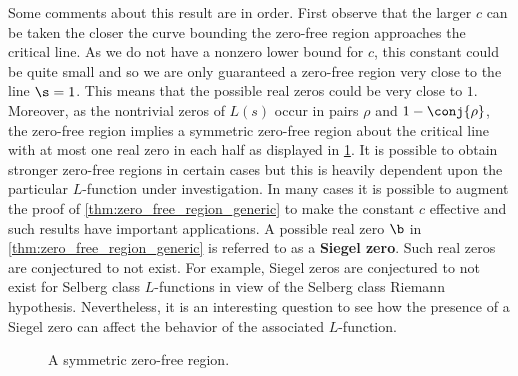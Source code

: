 \documentclass[12pt]{article}
\begin{document}
      Some comments about this result are in order. First observe that the larger \(c\) can be taken the closer the curve bounding the zero-free region approaches the critical line. As we do not have a nonzero lower bound for \(c\), this constant could be quite small and so we are only guaranteed a zero-free region very close to the line \(\s = 1\). This means that the possible real zeros could be very close to \(1\). Moreover, as the nontrivial zeros of \(L(s)\) occur in pairs \(\rho\) and \(1-\conj{\rho}\), the zero-free region implies a symmetric zero-free region about the critical line with at most one real zero in each half as displayed in \cref{fig:symmetric_zero_free_region}. It is possible to obtain stronger zero-free regions in certain cases but this is heavily dependent upon the particular \(L\)-function under investigation. In many cases it is possible to augment the proof of \cref{thm:zero_free_region_generic} to make the constant \(c\) effective and such results have important applications. A possible real zero \(\b\) in \cref{thm:zero_free_region_generic} is referred to as a \textbf{Siegel zero}. Such real zeros are conjectured to not exist. For example, Siegel zeros are conjectured to not exist for Selberg class \(L\)-functions in view of the Selberg class Riemann hypothesis. Nevertheless, it is an interesting question to see how the presence of a Siegel zero can affect the behavior of the associated \(L\)-function.

      \begin{figure}[h]
        \centering
        \caption{A symmetric zero-free region.}
        \label{fig:symmetric_zero_free_region}
      \end{figure}
\end{document}
